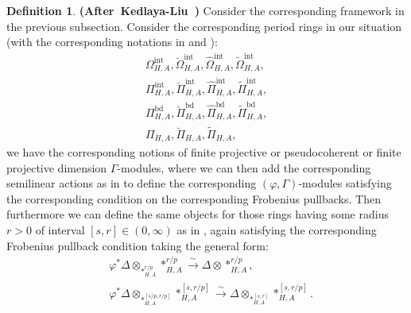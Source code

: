 \documentclass[12pt]{amsart}
\theoremstyle{definition}
\newtheorem{definition}[theorem]{Definition}
\numberwithin{equation}{section}
\begin{document}
\begin{definition}\mbox{\bf{(After Kedlaya-Liu \cite[Definition 5.7.2]{KL16})}}
Consider the corresponding framework in the previous subsection. Consider the corresponding period rings in our situation (with the corresponding notations in \cite{XT1} and \cite{XT2}):
\begin{align}
\Omega^{\mathrm{int}}_{H,A},\breve{\Omega}_{H,A}^{\mathrm{int}},\widehat{\Omega}_{H,A}^{\mathrm{int}},\widetilde{\Omega}_{H,A}^{\mathrm{int}},\\
\Pi^{\mathrm{int}}_{H,A},\breve{\Pi}_{H,A}^{\mathrm{int}},\widehat{\Pi}_{H,A}^{\mathrm{int}},\widetilde{\Pi}_{H,A}^{\mathrm{int}},\\
\Pi^{\mathrm{bd}}_{H,A},\breve{\Pi}_{H,A}^{\mathrm{bd}},\widehat{\Pi}_{H,A}^{\mathrm{bd}},\widetilde{\Pi}_{H,A}^{\mathrm{bd}},\\
\Pi_{H,A},\breve{\Pi}_{H,A},\widetilde{\Pi}_{H,A},
\end{align}
we have the corresponding notions of finite projective or pseudocoherent or finite projective dimension $\Gamma$-modules, where we can then add the corresponding semilinear actions as in \cite[Definition 5.7.2]{KL16} to define the corresponding $(\varphi,\Gamma)$-modules satisfying the corresponding condition on the corresponding Frobenius pullbacks. Then furthermore we can define the same objects for those rings having some radius $r>0$ of interval $[s,r]\in (0,\infty)$ as in \cite[Definition 5.7.2]{KL16}, again satisfying the corresponding Frobenius pullback condition taking the general form:
\begin{align}
&\varphi^*\Delta \otimes_{*_{H,A}^{r/p}} *_{{H,A}}^{r/p} \overset{\sim}{\rightarrow} \Delta \otimes *_{{H,A}}^{r/p},\\
&\varphi^*\Delta \otimes_{*_{H,A}^{[s/p,r/p]}} *_{H,A}^{[s,r/p]} \overset{\sim}{\rightarrow} \Delta \otimes_{*_{H,A}^{[s,r]}} *_{H,A}^{[s,r/p]}.	
\end{align}
\end{definition}
\end{document}
